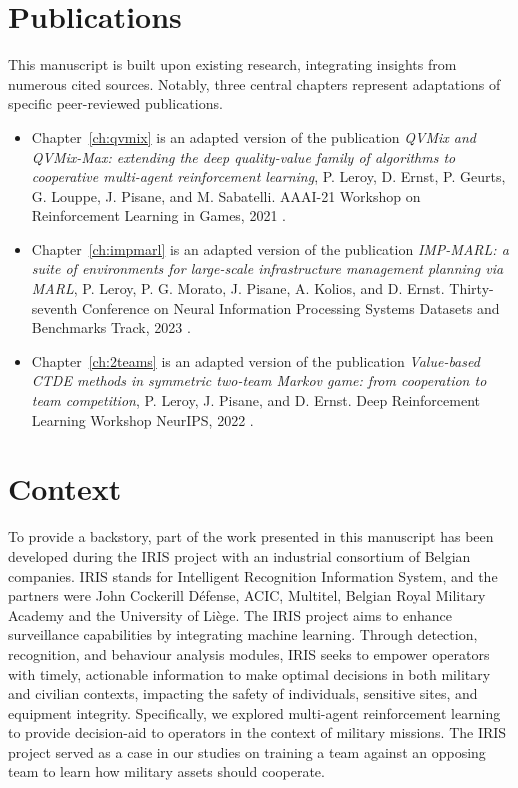 \section{Publications}
\label{sec:ch1_publications}

This manuscript is built upon existing research, integrating insights from numerous cited sources.
Notably, three central chapters represent adaptations of specific peer-reviewed publications.

\begin{itemize}
\item Chapter~\ref{ch:qvmix} is an adapted version of the publication \textit{QVMix and QVMix-Max: extending the deep quality-value family of algorithms to cooperative multi-agent reinforcement learning}, P. Leroy, D. Ernst, P. Geurts, G. Louppe, J. Pisane, and M. Sabatelli. AAAI-21 Workshop on Reinforcement Learning in Games, 2021 \citep{leroy2020qvmix}.

\item Chapter~\ref{ch:impmarl} is an adapted version of the publication \textit{IMP-MARL: a suite of environments for large-scale infrastructure management planning via MARL}, P. Leroy, P. G. Morato, J. Pisane, A. Kolios, and D. Ernst. Thirty-seventh Conference on Neural Information Processing Systems Datasets and Benchmarks Track, 2023 \citep{leroy2023impmarl}.

\item Chapter~\ref{ch:2teams} is an adapted version of the publication \textit{Value-based CTDE methods in symmetric two-team Markov game: from cooperation to team competition}, P. Leroy, J. Pisane, and D. Ernst. Deep Reinforcement Learning Workshop NeurIPS, 2022 \citep{leroy2022twoteam}.
\end{itemize}


\section{Context}
\label{sec:ch1_context}
To provide a backstory, part of the work presented in this manuscript has been developed during the IRIS project with an industrial consortium of Belgian companies.
IRIS stands for Intelligent Recognition Information System, and the partners were John Cockerill D{\'{e}}fense, ACIC, Multitel, Belgian Royal Military Academy and the University of Li{\`{e}}ge.
The IRIS project aims to enhance surveillance capabilities by integrating machine learning.
Through detection, recognition, and behaviour analysis modules, IRIS seeks to empower operators with timely, actionable information to make optimal decisions in both military and civilian contexts, impacting the safety of individuals, sensitive sites, and equipment integrity.
Specifically, we explored multi-agent reinforcement learning to provide decision-aid to operators in the context of military missions.
The IRIS project served as a case in our studies on training a team against an opposing team to learn how military assets should cooperate.
